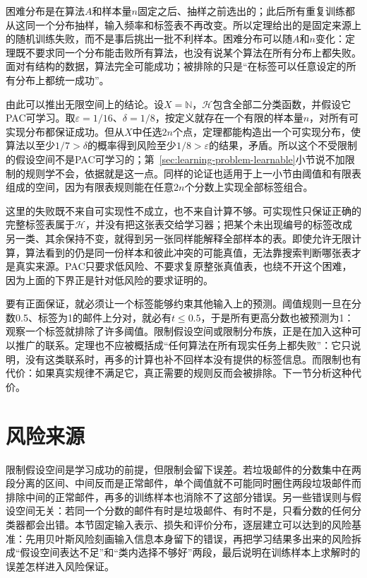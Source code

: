 困难分布是在算法$A$和样本量$n$固定之后、抽样之前选出的；此后所有重复训练都从这同一个分布抽样，输入频率和标签表不再改变。所以定理给出的是固定来源上的随机训练失败，而不是事后挑出一批不利样本。困难分布可以随$A$和$n$变化：定理既不要求同一个分布能击败所有算法，也没有说某个算法在所有分布上都失败。面对有结构的数据，算法完全可能成功；被排除的只是“在标签可以任意设定的所有分布上都统一成功”。

由此可以推出无限空间上的结论。设$X=\mathbb N$，$\mathcal H$包含全部二分类函数，并假设它PAC可学习。取$\varepsilon=1/16$、$\delta=1/8$，按定义就存在一个有限的样本量$n$，对所有可实现分布都保证成功。但从$X$中任选$2n$个点，定理都能构造出一个可实现分布，使算法以至少$1/7>\delta$的概率得到风险至少$1/8>\varepsilon$的结果，矛盾。所以这个不受限制的假设空间不是PAC可学习的；第~\ref{sec:learning-problem-learnable}小节说不加限制的规则学不会，依据就是这一点。同样的论证也适用于上一小节由阈值和有限表组成的空间，因为有限表规则能在任意$2n$个分数上实现全部标签组合。

这里的失败既不来自可实现性不成立，也不来自计算不够。可实现性只保证正确的完整标签表属于$\mathcal H$，并没有把这张表交给学习器；把某个未出现编号的标签改成另一类、其余保持不变，就得到另一张同样能解释全部样本的表。即使允许无限计算，算法看到的仍是同一份样本和彼此冲突的可能真值，无法靠搜索判断哪张表才是真实来源。PAC只要求低风险、不要求复原整张真值表，也绕不开这个困难，因为上面的下界正是针对低风险的要求证明的。

要有正面保证，就必须让一个标签能够约束其他输入上的预测。阈值规则一旦在分数0.5、标签为1的邮件上分对，就必有$t\leq0.5$，于是所有更高分数也被预测为1：观察一个标签就排除了许多阈值。限制假设空间或限制分布族，正是在加入这种可以推广的联系。定理也不应被概括成“任何算法在所有现实任务上都失败”：它只说明，没有这类联系时，再多的计算也补不回样本没有提供的标签信息。而限制也有代价：如果真实规律不满足它，真正需要的规则反而会被排除。下一节分析这种代价。

\section{风险来源}
\label{sec:statistical-model-selection}
\label{sec:risk-sources}

限制假设空间是学习成功的前提，但限制会留下误差。若垃圾邮件的分数集中在两段分离的区间、中间反而是正常邮件，单个阈值就不可能同时圈住两段垃圾邮件而排除中间的正常邮件，再多的训练样本也消除不了这部分错误。另一些错误则与假设空间无关：若同一个分数的邮件有时是垃圾邮件、有时不是，只看分数的任何分类器都会出错。本节固定输入表示、损失和评价分布，逐层建立可以达到的风险基准：先用贝叶斯风险刻画输入信息本身留下的错误，再把学习结果多出来的风险拆成“假设空间表达不足”和“类内选择不够好”两段，最后说明在训练样本上求解时的误差怎样进入风险保证。

